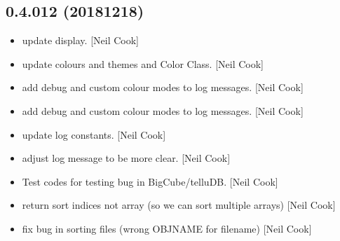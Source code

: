 \documentclass[a4paper,10pt,english]{report}
\begin{document}
\subsection{0.4.012 (2018\sphinxhyphen{}12\sphinxhyphen{}18)}
\label{\detokenize{misc/changelog:id246}}\begin{itemize}
\item {} 
 \sphinxhyphen{} update display. {[}Neil Cook{]}

\item {} 
 \sphinxhyphen{} update colours and themes and Color Class. {[}Neil
Cook{]}

\item {} 
 \sphinxhyphen{} add debug and custom colour modes to log messages.
{[}Neil Cook{]}

\item {} 
 \sphinxhyphen{} add debug and custom colour modes to log messages.
{[}Neil Cook{]}

\item {} 
 \sphinxhyphen{} update log constants. {[}Neil Cook{]}

\item {} 
 \sphinxhyphen{} adjust log message to be more clear. {[}Neil
Cook{]}

\item {} 
Test codes for testing bug in BigCube/telluDB. {[}Neil Cook{]}

\item {} 
 \sphinxhyphen{} return sort indices not array (so we can
sort multiple arrays) {[}Neil Cook{]}

\item {} 
 \sphinxhyphen{} fix bug in sorting files (wrong OBJNAME for
filename) {[}Neil Cook{]}

\end{itemize}
\end{document}
